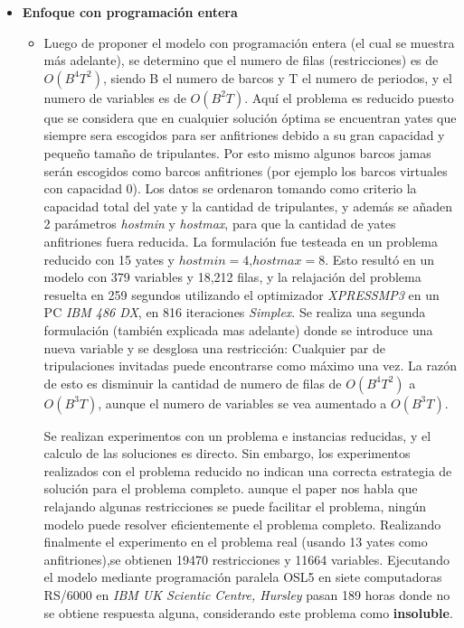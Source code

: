 \documentclass[letter, 10pt]{article}
\begin{document}
\begin{itemize}
\item \textbf{Enfoque con programación entera}
\begin{itemize}    
\item 
Luego de proponer el modelo con programación entera (el cual se muestra más adelante), se determino que el numero de filas (restricciones) es de $O(B^4T^2)$, siendo B el numero de barcos y T el numero de periodos, y el numero de variables es de $O(B^2T)$. Aquí el problema es reducido puesto que se considera que en cualquier solución óptima se encuentran yates que siempre sera escogidos para ser anfitriones debido a su gran capacidad y pequeño tamaño de tripulantes. Por esto mismo algunos barcos jamas serán escogidos como barcos anfitriones (por ejemplo los barcos virtuales con capacidad 0). Los datos se ordenaron tomando como criterio la capacidad total del yate y la cantidad de tripulantes, y además se añaden 2 parámetros \textit{hostmin} y \textit{hostmax}, para que la cantidad de yates anfitriones fuera reducida. La formulación fue testeada en un problema reducido con 15 yates y $hostmin = 4$,$hostmax = 8$. Esto resultó en un
modelo con 379 variables y 18,212 filas, y la relajación del problema resuelta en 259 segundos utilizando el optimizador \textit{XPRESSMP3} en un PC \textit{IBM 486 DX}, en 816
iteraciones \textit{Simplex}.
Se realiza una segunda formulación (también explicada mas adelante) donde  se introduce una nueva variable y se desglosa una restricción: Cualquier par de tripulaciones invitadas puede encontrarse como máximo una vez. La razón de esto es disminuir la cantidad de numero de filas de $O(B^4T^2)$ a $O(B^3T)$, aunque el numero de variables se vea aumentado a $O(B^3T)$. 

Se realizan experimentos con un problema e instancias reducidas, y el calculo de las soluciones es directo. Sin embargo, los experimentos realizados con el problema reducido no indican una correcta estrategia de solución para el problema completo. aunque el paper nos habla que relajando algunas restricciones se puede facilitar el problema, ningún modelo puede resolver eficientemente el problema completo. Realizando finalmente el experimento en el problema real (usando 13 yates como anfitriones),se obtienen 19470 restricciones y 11664 variables. Ejecutando el modelo mediante programación paralela OSL5 en siete computadoras RS/6000 en \textit{IBM UK Scientic Centre, Hursley} pasan 189 horas donde no se obtiene respuesta alguna, considerando este problema como \textbf{insoluble}.
\end{itemize}


\end{itemize}
\end{document}
